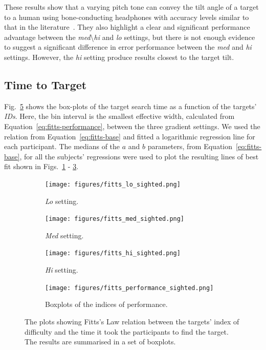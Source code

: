 \documentclass[sigconf, review=true, screen=true, anonymous=true]{acmart}
\begin{document}
These results show that a varying pitch tone can convey the tilt angle of a target to a human using bone-conducting headphones with accuracy levels similar to that in the literature~\cite{bujacz2011sonification, katz2011spatial, zotkin2004rendering}. They also highlight a clear and significant performance advantage between the \emph{med}\textbackslash\emph{hi} and \emph{lo} settings, but there is not enough evidence to suggest a significant difference in error performance between the \emph{med} and \emph{hi} settings. However, the \emph{hi} setting produce results closest to the target tilt. 

\subsection{Time to Target}

Fig.~\ref{fig:fitts} shows the box-plots of the target search time as a function of the targets' \emph{IDs}. Here, the bin interval is the smallest effective width, calculated from Equation~\ref{eq:fitts-performance}, between the three gradient settings. We used the relation from Equation~\ref{eq:fitts-base} and fitted a logarithmic regression line for each participant. The medians of the $a$ and $b$ parameters, from Equation~\ref{eq:fitts-base}, for all the subjects' regressions were used to plot the resulting lines of best fit shown in Figs.~\ref{fig:fitts-lo} - \ref{fig:fitts-hi}. 

\begin{figure}
  \centering
  \begin{subfigure}[t]{0.5\textwidth}
    \centering
    \texttt{[image: figures/fitts\_lo\_sighted.png]}
    \caption{\emph{Lo} setting. }
    \label{fig:fitts-lo}
  \end{subfigure}%
  \begin{subfigure}[t]{0.5\textwidth}
    \centering
    \texttt{[image: figures/fitts\_med\_sighted.png]}
    \caption{\emph{Med} setting. }
    \label{fig:fitts-med}
  \end{subfigure}

  \begin{subfigure}[t]{0.5\textwidth}
    \centering
    \texttt{[image: figures/fitts\_hi\_sighted.png]}
    \caption{\emph{Hi} setting. }
    \label{fig:fitts-hi}
  \end{subfigure}%
  \begin{subfigure}[t]{0.5\textwidth}
    \centering
    \texttt{[image: figures/fitts\_performance\_sighted.png]}
    \caption{Boxplots of the indices of performance.}
    \label{fig:fitts-performance}
  \end{subfigure}
  \caption{The plots showing Fitts's Law relation between the targets' index of difficulty and the time it took the participants to find the target. The results are summarised in a set of boxplots.}
  \label{fig:fitts}
\end{figure}
\end{document}
